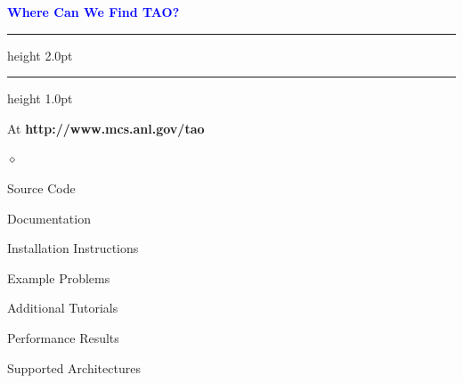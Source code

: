 \documentclass{seminar}
\newcommand{\reddiamond}{\textcolor{BrickRed}{$\diamond$}}
\newcommand{\redstripe}{\textcolor{BrickRed}{\hrule height 2.0pt\hfil}
             \vspace{-1.8pt}
             \textcolor{BrickRed}{\hrule height 1.0pt\hfil}
}
\newcommand{\heading}[1]{%
   \vspace*{0.5pt}%
   \centerline{\textcolor{Blue}{\textbf{#1}}}%
   \redstripe
}
\begin{document}
\begin{slide}
\heading{Where Can We Find TAO?}

At {\bf http://www.mcs.anl.gov/tao}

\begin{list}{\reddiamond}{\leftmargin=1in}
\item
Source Code
\item
Documentation
\item
Installation Instructions
\item
Example Problems
\item
Additional Tutorials
\item
Performance Results
\item
Supported Architectures
\end{list}

\vfill

\end{slide}
\end{document}
